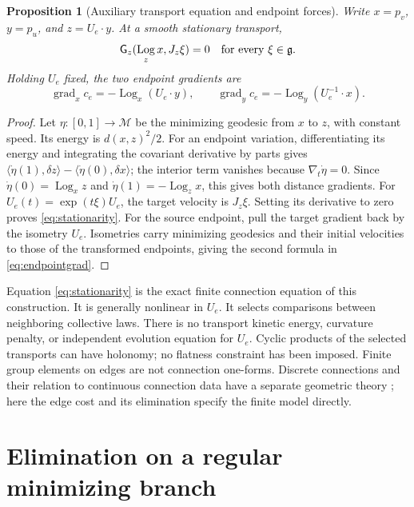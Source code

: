 \documentclass[11pt]{article}
\newtheorem{proposition}[theorem]{Proposition}
\DeclareMathOperator{\grad}{grad}
\DeclareMathOperator{\Log}{Log}
\newcommand{\M}{\mathcal M}
\newcommand{\G}{\mathsf G}
\begin{document}
\begin{proposition}[Auxiliary transport equation and endpoint forces]
Write $x=p_v$, $y=p_u$, and $z=U_e\cdot y$. At a smooth stationary transport,
\begin{equation}
 \G_z(\Log_z x,J_z\xi)=0
 \quad\hbox{for every }\xi\in\mathfrak g.
 \label{eq:stationarity}
\end{equation}
Holding $U_e$ fixed, the two endpoint gradients are
\begin{equation}
 \grad_x c_e=-\Log_x(U_e\cdot y),\qquad
 \grad_y c_e=-\Log_y(U_e^{-1}\cdot x).
 \label{eq:endpointgrad}
\end{equation}
\end{proposition}
\begin{proof}
Let $\eta:[0,1]\to\M$ be the minimizing geodesic from $x$ to $z$, with constant speed. Its energy is $d(x,z)^2/2$. For an endpoint variation, differentiating its energy and integrating the covariant derivative by parts gives
$\langle\dot\eta(1),\delta z\rangle-\langle\dot\eta(0),\delta x\rangle$;
the interior term vanishes because $\nabla_t\dot\eta=0$. Since
$\dot\eta(0)=\Log_xz$ and $\dot\eta(1)=-\Log_zx$, this gives both distance gradients. For $U_e(t)=\exp(t\xi)U_e$, the target velocity is $J_z\xi$. Setting its derivative to zero proves \eqref{eq:stationarity}. For the source endpoint, pull the target gradient back by the isometry $U_e$. Isometries carry minimizing geodesics and their initial velocities to those of the transformed endpoints, giving the second formula in \eqref{eq:endpointgrad}.
\end{proof}

Equation \eqref{eq:stationarity} is the exact finite connection equation of this construction. It is generally nonlinear in $U_e$. It selects comparisons between neighboring collective laws. There is no transport kinetic energy, curvature penalty, or independent evolution equation for $U_e$. Cyclic products of the selected transports can have holonomy; no flatness constraint has been imposed. Finite group elements on edges are not connection one-forms. Discrete connections and their relation to continuous connection data have a separate geometric theory \cite{Leok2005}; here the edge cost and its elimination specify the finite model directly.

\section{Elimination on a regular minimizing branch}
\end{document}
